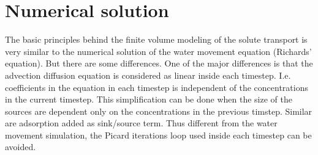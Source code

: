 \documentclass{report}
\begin{document}
%
%
%



\section{Numerical solution}

The basic principles behind the finite volume modeling of the solute
transport is very similar to the numerical solution of the water
movement equation (Richards' equation). But there are some
differences. One of the major differences is that the advection
diffusion equation is considered as linear inside each timestep.
I.e. coefficients in the equation in each timestep is independent of
the concentrations in the current timestep. This simplification can
be done when the size of the sources are dependent only on the
concentrations in the previous timstep. Similar are adsorption added
as sink/source term. Thus different from the water movement
simulation, the Picard iterations loop used inside each timestep can
be avoided.
\end{document}
